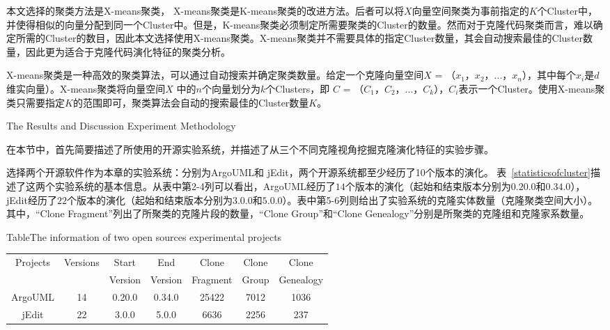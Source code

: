 本文选择的聚类方法是X-means聚类\cite{pelleg2000x}， X-means聚类是K-means聚类\cite{arthur2007k}的改进方法。后者可以将$X$向量空间聚类为事前指定的$K$个Cluster中，并使得相似的向量分配到同一个Cluster中。但是，K-means聚类必须制定所需要聚类的Cluster的数量。然而对于克隆代码聚类而言，难以确定所需的Cluster的数目，因此本文选择使用X-means聚类。X-means聚类并不需要具体的指定Cluster数量，其会自动搜索最佳的Cluster数量，因此更为适合于克隆代码演化特征的聚类分析。

X-means聚类是一种高效的聚类算法，可以通过自动搜索并确定聚类数量\cite{pelleg2000x}。给定一个克隆向量空间$X$ = {（$x_1$，$x_2$，$...$，$x_n$）}，其中每个$x_i$是$d$维实向量）。X-means聚类将向量空间$X$ 中的$n$个向量划分为$k$个Clusters，即 $C$ = {（$C_1$，$C_2$，$...$，$C_k$）}，$C_i$表示一个Cluster。使用X-means聚类只需要指定$K$的范围即可，聚类算法会自动的搜索最佳的Cluster数量$K$。

{The Results and Discussion}
\label{ref-characteristics}
{Experiment Methodology}

在本节中，首先简要描述了所使用的开源实验系统，并描述了从三个不同克隆视角挖掘克隆演化特征的实验步骤。

选择两个开源软件作为本章的实验系统：分别为{ArgoUML}和{ jEdit}，两个开源系统都至少经历了10个版本的演化。%
表~\ref{statisticsofcluster}描述了这两个实验系统的基本信息。从表中第2-4列可以看出，{ArgoUML}经历了$14 $个版本的演化（起始和结束版本分别为$0.20.0$和$0.34.0$），{ jEdit}经历了$22$个版本的演化（起始和结束版本分别为$3.0.0$和$5.0.0$）。表中第5-6列则给出了实验系统的克隆实体数量（克隆聚类空间大小）。其中，“Clone Fragment”列出了所聚类的克隆片段的数量，“Clone Group”和“Clone Genealogy”分别是所聚类的克隆组和克隆家系数量。

\begin{table}[htbp]
{Table$\!$}{The information of two open sources experimental projects }
\vspace{0.5em}
\centering 
\wuhao
\begin{tabular}{ccccccc}
\toprule[1.5pt ]
\multirow{2}{*}{Projects}&\multirow{2}{*}{Versions}&Start&End&Clone&Clone&Clone\\ 
&&Version&Version&Fragment&Group&Genealogy\\
\midrule[1pt]
ArgoUML&14&0.20.0&0.34.0&25422&7012&1036\\ 
jEdit&22&3.0.0&5.0.0&6636&2256	&237\\ 
\bottomrule[1.5pt]
\end{tabular}
\end{table}

